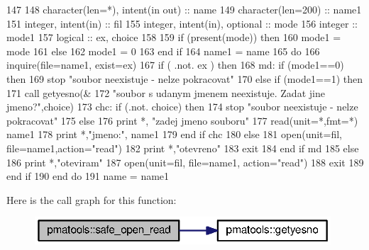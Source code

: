 \begin{DoxyCode}
147 
148         \textcolor{keywordtype}{character(len=*)}, \textcolor{keywordtype}{intent(in out)}  :: name
149         \textcolor{keywordtype}{character(len=200)}            :: name1
151         \textcolor{keywordtype}{integer}, \textcolor{keywordtype}{intent(in)} :: fil
155         \textcolor{keywordtype}{integer}, \textcolor{keywordtype}{intent(in)}, \textcolor{keywordtype}{optional}  :: mode
156         \textcolor{keywordtype}{integer} :: mode1
157         \textcolor{keywordtype}{logical} :: ex, choice
158 
159         \textcolor{keywordflow}{if} (\textcolor{keyword}{present}(mode)) then
160         mode1 = mode
161         else
162             mode1 = 0
163 \textcolor{keyword}{        end }if
164         name1 = name
165         do
166             \textcolor{keyword}{inquire}(file=name1, exist=ex)
167             \textcolor{keywordflow}{if} ( .not. ex ) then
168                 md: \textcolor{keywordflow}{if} (mode1==0) then
169                 stop \textcolor{stringliteral}{"soubor neexistuje - nelze pokracovat"}
170                 \textcolor{keywordflow}{else} \textcolor{keywordflow}{if} (mode1==1) then
171                     \textcolor{keyword}{call }getyesno(&
172                     \textcolor{stringliteral}{"soubor s udanym jmenem neexistuje. Zadat jine jmeno?"},choice)
173                     chc: \textcolor{keywordflow}{if} (.not. choice) then
174                     stop \textcolor{stringliteral}{"soubor neexistuje - nelze pokracovat"}
175                     else
176                         print *, \textcolor{stringliteral}{"zadej jmeno souboru"}
177                         \textcolor{keyword}{read}(unit=*,fmt=*) name1
178                         print *,\textcolor{stringliteral}{"jmeno:"}, name1
179 \textcolor{keywordflow}{                    end if} chc
180                 else
181                     \textcolor{keyword}{open}(unit=fil, file=name1,action=\textcolor{stringliteral}{"read"})
182                     print *,\textcolor{stringliteral}{"otevreno"}
183                     exit
184 \textcolor{keywordflow}{                end if} md
185             else
186                 print *,\textcolor{stringliteral}{"oteviram"}
187                 \textcolor{keyword}{open}(unit=fil, file=name1, action=\textcolor{stringliteral}{"read"})
188                 exit
189 \textcolor{keyword}{            end }if
190 \textcolor{keyword}{        end }do
191         name = name1
\end{DoxyCode}


Here is the call graph for this function\+:\nopagebreak
\begin{figure}[H]
\begin{center}
\leavevmode
\includegraphics[width=313pt]{namespacepmatools_a15c0bdc3cabbe05b8c76d56a3f5a83a5_cgraph}
\end{center}
\end{figure}




